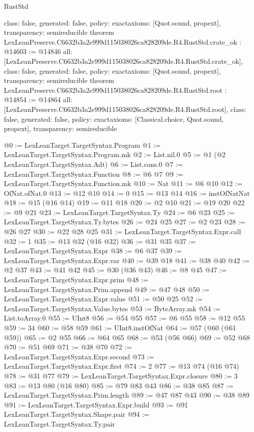 \begin{lexlean}{RustStd}
\begin{coremodule}
{  class: false,
  generated: false,
  policy: exact{axioms: [Quot.sound, propext]},
  transparency: semireducible
}
theorem LexLeanPreserve.C6632b3a2e999d115038026ca828209de.R4.RustStd.crate_ok : @14603 := @14846 {
  all: [LexLeanPreserve.C6632b3a2e999d115038026ca828209de.R4.RustStd.crate_ok],
  class: false,
  generated: false,
  policy: exact{axioms: [Quot.sound, propext]},
  transparency: semireducible
}
theorem LexLeanPreserve.C6632b3a2e999d115038026ca828209de.R4.RustStd.root : @14854 := @14864 {
  all: [LexLeanPreserve.C6632b3a2e999d115038026ca828209de.R4.RustStd.root],
  class: false,
  generated: false,
  policy: exact{axioms: [Classical.choice, Quot.sound, propext]},
  transparency: semireducible
}

@0 := LexLeanTarget.TargetSyntax.Program
@1 := LexLeanTarget.TargetSyntax.Program.mk
@2 := List.nil.{0}
@5 := @1 (@2 LexLeanTarget.TargetSyntax.Adt)
@6 := List.cons.{0}
@7 := LexLeanTarget.TargetSyntax.Function
@8 := @6 @7
@9 := LexLeanTarget.TargetSyntax.Function.mk
@10 := Nat
@11 := @6 @10
@12 := OfNat.ofNat.{0}
@13 := @12 @10
@14 := 0
@15 := @13 @14
@16 := instOfNatNat
@18 := @15 (@16 @14)
@19 := @11 @18
@20 := @2 @10
@21 := @19 @20
@22 := @9 @21
@23 := LexLeanTarget.TargetSyntax.Ty
@24 := @6 @23
@25 := LexLeanTarget.TargetSyntax.Ty.bytes
@26 := @24 @25
@27 := @2 @23
@28 := @26 @27
@30 := @22 @28 @25
@31 := LexLeanTarget.TargetSyntax.Expr.call
@32 := 1
@35 := @13 @32 (@16 @32)
@36 := @31 @35
@37 := LexLeanTarget.TargetSyntax.Expr
@38 := @6 @37
@39 := LexLeanTarget.TargetSyntax.Expr.var
@40 := @39 @18
@41 := @38 @40
@42 := @2 @37
@43 := @41 @42
@45 := @30 (@36 @43)
@46 := @8 @45
@47 := LexLeanTarget.TargetSyntax.Expr.prim
@48 := LexLeanTarget.TargetSyntax.Prim.append
@49 := @47 @48
@50 := LexLeanTarget.TargetSyntax.Expr.value
@51 := @50 @25
@52 := LexLeanTarget.TargetSyntax.Value.bytes
@53 := ByteArray.mk
@54 := List.toArray.{0}
@55 := UInt8
@56 := @54 @55
@57 := @6 @55
@58 := @12 @55
@59 := 34
@60 := @58 @59
@61 := UInt8.instOfNat
@64 := @57 (@60 (@61 @59))
@65 := @2 @55
@66 := @64 @65
@68 := @53 (@56 @66)
@69 := @52 @68
@70 := @51 @69
@71 := @38 @70
@72 := LexLeanTarget.TargetSyntax.Expr.second
@73 := LexLeanTarget.TargetSyntax.Expr.first
@74 := 2
@77 := @13 @74 (@16 @74)
@78 := @31 @77
@79 := LexLeanTarget.TargetSyntax.Expr.closure
@80 := 3
@83 := @13 @80 (@16 @80)
@85 := @79 @83 @43
@86 := @38 @85
@87 := LexLeanTarget.TargetSyntax.Prim.length
@89 := @47 @87 @43
@90 := @38 @89
@91 := LexLeanTarget.TargetSyntax.Expr.build
@93 := @91 LexLeanTarget.TargetSyntax.Shape.pair
@94 := LexLeanTarget.TargetSyntax.Ty.pair

\end{coremodule}
\end{lexlean}
